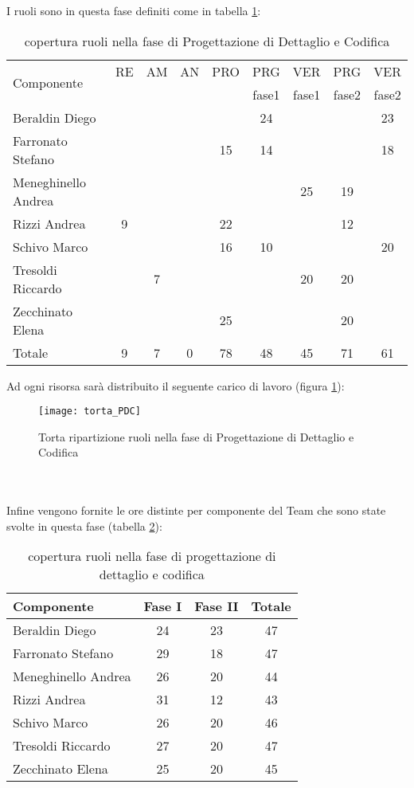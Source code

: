 I ruoli sono in questa fase definiti come in tabella \ref{tab:ruolidc}:\\
\begin{table}[h!]
\centering
\begin{tabular}{|l|c|c|c|c|c|c|c|c|}
\hline
\multirow{2}{*}{Componente}& RE& AM& AN& PRO& PRG&VER& PRG& VER \\
					      &    &     &      &        & fase1&fase1&fase2&fase2\\
\hline
Beraldin Diego & & & & & 24& & & 23\\
Farronato Stefano & & & & 15&14 & & & 18\\
Meneghinello Andrea & & & & & & 25& 19& \\
Rizzi Andrea & 9& & & 22& & & 12& \\
Schivo Marco & & & & 16& 10& & & 20\\
Tresoldi Riccardo & & 7& & & & 20& 20& \\
Zecchinato Elena & & & & 25& & & 20& \\
\hline
Totale & 9& 7& 0& 78& 48& 45& 71& 61\\
\hline
\end{tabular}
\caption{copertura ruoli nella fase di Progettazione di Dettaglio e Codifica}\label{tab:ruolidc}
\end{table}
\clearpage
Ad ogni risorsa sarà distribuito il seguente carico di lavoro (figura \ref{fig:ruolidc}):\\
\begin{figure}[h!]
\centering
  \texttt{[image: torta\_PDC]}
\caption{Torta ripartizione ruoli nella fase di Progettazione di Dettaglio e Codifica}\label{fig:ruolidc}
\end{figure}
\\\\
Infine vengono fornite le ore distinte per componente del Team che sono state svolte in questa fase (tabella \ref{tab:ruolidc2}):\\
\begin{table}[h]
\centering
\begin{tabular}{|l|c|c|c|}
\hline
Componente& Fase I& Fase II& Totale\\
\hline
Beraldin Diego & 24& 23& 47\\
Farronato Stefano & 29& 18& 47\\
Meneghinello Andrea & 26& 20& 44\\
Rizzi Andrea &31 &12 & 43\\
Schivo Marco & 26& 20& 46\\
Tresoldi Riccardo & 27& 20& 47\\
Zecchinato Elena & 25& 20& 45\\
\hline
\end{tabular}
\caption{copertura ruoli nella fase di progettazione di dettaglio e codifica}\label{tab:ruolidc2}
\end{table}
\clearpage
